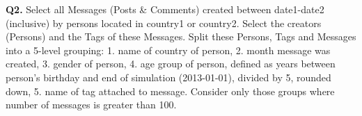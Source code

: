 \textbf{Q2.}
Select all Messages (Posts \& Comments) created between date1-date2
(inclusive) by persons located in country1 or country2. Select the
creators (Persons) and the Tags of these Messages. Split these Persons,
Tags and Messages into a 5-level grouping: 1. name of country of person, 2. month message was created, 3. gender of person, 4. age group of person, defined as years between person's birthday and end of simulation (2013-01-01), divided by 5, rounded down, 5. name of tag attached to message. Consider only those groups where number of messages is greater than 100.
